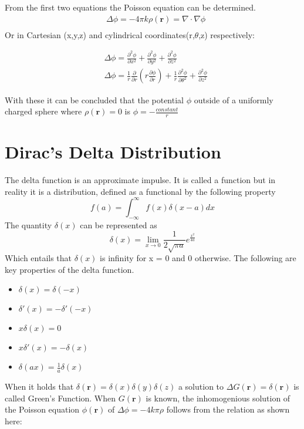 \noindent From the first two equations the Poisson equation can be determined.
\begin{equation}
\begin{aligned}
   &\Delta \phi = -4\pi k \rho(\textbf{r}) = \nabla \cdot \nabla \phi\\
\end{aligned}
\end{equation}
\noindent Or in Cartesian (x,y,z) and cylindrical coordinates(r,$\theta$,z) respectively:

\begin{equation}
    \begin{aligned}
    &\Delta \phi = \frac{\partial^2 \phi}{\partial x^2} + \frac{\partial^2 \phi}{\partial y^2} + \frac{\partial^2 \phi}{\partial z^2}\\
    &\Delta \phi= \frac{1}{r}\frac{\partial}{\partial r}\left(r\frac{\partial \phi}{\partial r}\right) + \frac{1}{r}\frac{\partial^2 \phi}{\partial \theta^2} + \frac{\partial^2 \phi}{\partial z^2}
    \end{aligned}
\end{equation}

\noindent With these it can be concluded that the potential $\phi$ outside of a uniformly charged sphere where $\rho(\textbf{r}) = 0$ is $\phi = - \frac{constant}{r}$


\section{Dirac's Delta Distribution}
The delta function is an approximate impulse. It is called a function but in reality it is a distribution, defined as a functional by the following property
\begin{equation}
    f(a) =  \int_{-\infty}^\infty f(x)\delta(x-a)dx
\end{equation}
The quantity $\delta(x)$ can be represented as
\begin{equation}
    \delta (x) = \lim_{x\to 0} \frac{1}{2\sqrt{\pi a}}e^{\frac{x^2}{4a}}
\end{equation}
Which entails that $\delta(x)$ is infinity for x = 0 and 0 otherwise. The following are key properties of the delta function.
\begin{itemize}
    \item $\delta(x) = \delta(-x)$
    \item $\delta'(x) = - \delta'(-x)$
    \item $x\delta(x) = 0$
    \item $x\delta'(x) = -\delta(x)$
    \item $\delta(ax) = \frac{1}{a} \delta(x)$
\end{itemize} 
\noindent When it holds that $\delta(\textbf{r}) = \delta(x)\delta(y)\delta(z)$ a solution to $\Delta G(\textbf{r}) = \delta(\textbf{r}) $ is called Green's Function. When $G(\textbf{r})$ is known, the inhomogenious solution of the Poisson equation $\phi(\textbf{r})$ of $\Delta\phi = -4k\pi \rho$ follows from the relation as shown here:


